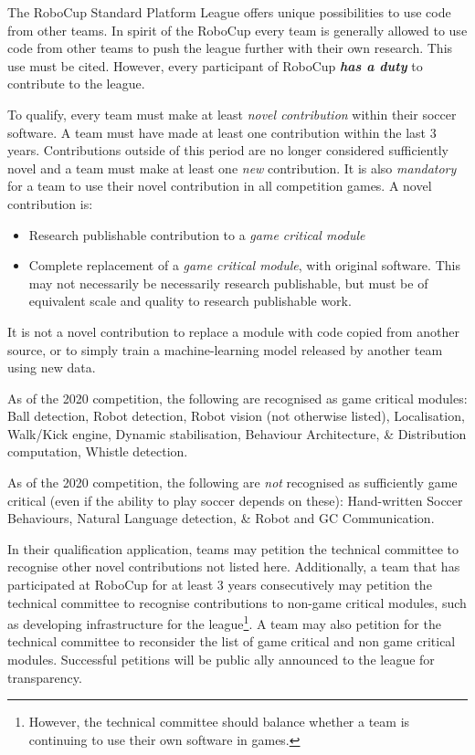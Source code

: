 \documentclass[12pt]{article}
\newcommand{\NovelContributionTime}{3 years\xspace}
\begin{document}
The RoboCup Standard Platform League offers unique possibilities to use code from other teams. In spirit of the RoboCup every team is generally allowed to use code from other teams to push the league further with their own research.
This use must be cited.
However, every participant of RoboCup \textbf{\textit{has a duty}} to contribute to the league.

To qualify, every team must make at least \textit{novel contribution} within their soccer software.
A team must have made at least one contribution within the last \NovelContributionTime.
Contributions outside of this period are no longer considered sufficiently novel and a team must make at least one \textit{new} contribution.
It is also \textit{mandatory} for a team to use their novel contribution in all competition games.
A novel contribution is:
\begin{itemize}
  \item Research publishable contribution to a \textit{game critical module}
  \item Complete replacement of a \textit{game critical module}, with original software. This may not necessarily be necessarily research publishable, but must be of equivalent scale and quality to research publishable work.
\end{itemize}

It is not a novel contribution to replace a module with code copied from another source, or to simply train a machine-learning model released by another team using new data.

As of the 2020 competition, the following are recognised as game critical modules:
Ball detection, Robot detection, Robot vision (not otherwise listed), Localisation, Walk/Kick engine, Dynamic stabilisation, Behaviour Architecture, \& Distribution computation, Whistle detection.

As of the 2020 competition, the following are \textit{not} recognised as sufficiently game critical (even if the ability to play soccer depends on these):
Hand-written Soccer Behaviours, Natural Language detection, \& Robot and GC Communication.

In their qualification application, teams may petition the technical committee to recognise other novel contributions not listed here.
Additionally, a team that has participated at RoboCup for at least \NovelContributionTime consecutively may petition the technical committee to recognise contributions to non-game critical modules, such as developing infrastructure for the league\footnote{However, the technical committee should balance whether a team is continuing to use their own software in games.}.
A team may also petition for the technical committee to reconsider the list of game critical and non game critical modules.
Successful petitions will be public ally announced to the league for transparency.
\end{document}
